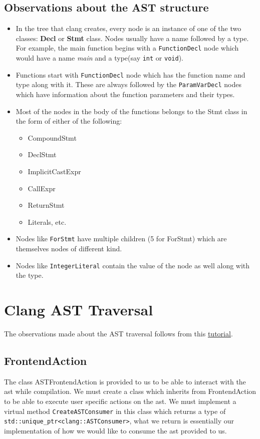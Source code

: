 \documentclass[12pt]{article}
\newcommand{\code}{\texttt}
\begin{document}
\subsection{Observations about the AST structure}
\begin{itemize}
\item In the tree that clang creates, every node is an instance of one of the two classes: \textbf{Decl} or \textbf{Stmt} class. Nodes usually have a name followed by a type. For example, the main function begins with a \code{FunctionDecl} node which would have a name \textit{main} and a type(say \code{int} or \code{void}).
\item Functions start with \code{FunctionDecl} node which has the function name and type along with it. These are always followed by the \code{ParamVarDecl} nodes which have information about the function parameters and their types.
\item Most of the nodes in the body of the functions belongs to the Stmt class in the form of either of the following:
\begin{itemize}
\item CompoundStmt
\item DeclStmt
\item ImplicitCastExpr
\item CallExpr
\item ReturnStmt
\item Literals, etc.
\end{itemize}
\item Nodes like \code{ForStmt} have multiple children (5 for ForStmt) which are themselves nodes of different kind.
\item Nodes like \code{IntegerLiteral} contain the value of the node as well along with the type.
\end{itemize}
\newpage
\section{Clang AST Traversal}
The observations made about the AST traversal follows from this \href{http://clang.llvm.org/docs/RAVFrontendAction.html}{tutorial}.
\subsection{FrontendAction}
The class ASTFrontendAction is provided to us to be able to interact with the ast while compilation. We must create a class which inherits from FrontendAction to be able to execute user specific actions on the ast. We must implement a virtual method \code{CreateASTConsumer} in this class which returns a type of \code{std::unique\_ptr<clang::ASTConsumer>}, what we return is essentially our implementation of how we would like to consume the ast provided to us.
\end{document}
